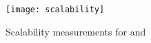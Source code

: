 \begin{figure}[!ht]
	\centering
	\texttt{[image: scalability]}
	\caption{Scalability measurements for \protocolGamma{} and \protocolNoGamma{}}%
	\label{figure:scalability}
\end{figure}
